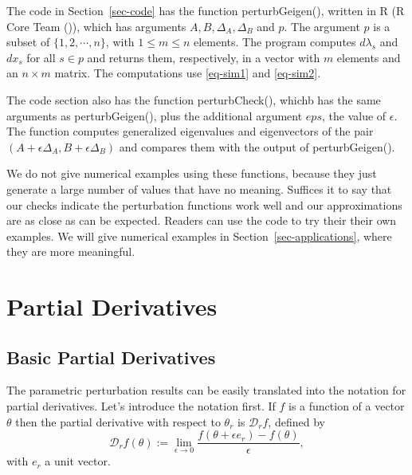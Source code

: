 \documentclass[
  12pt,
  letterpaper,
  DIV=11,
  numbers=noendperiod]{scrartcl}
\newcommand{\sectionbreak}{\clearpage}
\begin{document}
The code in Section~\ref{sec-code} has the function perturbGeigen(),
written in R (R Core Team ()), which
has arguments \(A, B, \Delta_A,\Delta_B\) and \(p\). The argument \(p\)
is a subset of \(\{1,2,\cdots,n\}\), with \(1\leq m\leq n\) elements.
The program computes \(d\lambda_s\) and \(dx_s\) for all \(s\in p\) and
returns them, respectively, in a vector with \(m\) elements and an
\(n\times m\) matrix. The computations use \eqref{eq-sim1} and
\eqref{eq-sim2}.

The code section also has the function perturbCheck(), whichb has the
same arguments as perturbGeigen(), plus the additional argument \(eps\),
the value of \(\epsilon\). The function computes generalized eigenvalues
and eigenvectors of the pair
\((A+\epsilon\Delta_A, B+\epsilon\Delta_B)\) and compares them with the
output of perturbGeigen().

We do not give numerical examples using these functions, because they
just generate a large number of values that have no meaning. Suffices it
to say that our checks indicate the perturbation functions work well and
our approximations are as close as can be expected. Readers can use the
code to try their their own examples. We will give numerical examples in
Section~\ref{sec-applications}, where they are more meaningful.

\sectionbreak

\section{Partial Derivatives}\label{sec-partial}

\subsection{Basic Partial Derivatives}\label{sec-parbasic}

The parametric perturbation results can be easily translated into the
notation for partial derivatives. Let's introduce the notation first. If
\(f\) is a function of a vector \(\theta\) then the partial derivative
with respect to \(\theta_r\) is \(\mathcal{D}_rf\), defined by
\begin{equation}
\mathcal{D}_rf(\theta):=\lim_{\epsilon\rightarrow 0}\frac{f(\theta+\epsilon e_r)-f(\theta)}{\epsilon},\label{eq-parderdef}
\end{equation} with \(e_r\) a unit vector.
\end{document}
